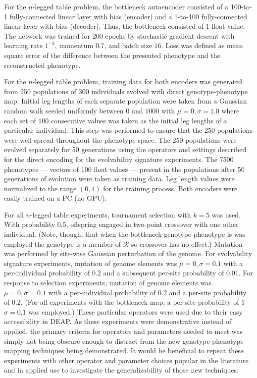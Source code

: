 For the $n$-legged table problem, the bottleneck autoencoder consisted of a 100-to-1 fully-connected linear layer with bias (encoder) and a 1-to-100 fully-connected linear layer with bias (decoder).
Thus, the bottleneck consisted of 1 float value.
The network was trained for 200 epochs by stochastic gradient descent with learning rate $1^{-3}$, momentum $0.7$, and batch size $16$.
Loss was defined as mean square error of the difference between the presented phenotype and the reconstructed phenotype.

For the $n$-legged table problem, training data for both encoders was generated from 250 populations of 300 individuals evolved with direct genotype-phenotype map.
Initial leg lengths of each separate population were taken from a Gaussian random walk seeded uniformly between $0$ and $1000$ with $\mu = 0, \sigma = 1.0$ where each set of 100 consecutive values was taken as the initial leg lengths of a particular individual.
This step was performed to ensure that the 250 populations were well-spread throughout the phenotype space.
The 250 populations were evolved separately for 50 generations using the operators and settings described for the direct encoding for the evolvability signature experiments.
The 7500 phenotypes --- vectors of 100 float values --- present in the populations after 50 generations of evolution were taken as training data.
Leg length values were normalized to the range $(0,1)$ for the training process.
Both encoders were easily trained on a PC (no GPU).

For all $n$-legged table experiments, tournament selection with $k = 5$ was used.
With probability $0.5$, offspring engaged in two-point crossover with one other individual.
(Note, though, that when the bottleneck genotype-phenotype is was employed the genotype is a member of $\mathcal{R}$ so crossover has no effect.)
Mutation was performed by site-wise Gaussian perturbation of the genome.
For evolvability signature experiments, mutation of genome elements was $\mu=0, \sigma=0.1$ with a per-individual probability of $0.2$ and a subsequent per-site probability of $0.01$.
For response to selection experiments, mutation of genome elements was $\mu=0, \sigma=0.1$ with a per-individual probability of $0.2$ and a per-site probability of $0.2$.
(For all experiments with the bottleneck map, a per-site probability of $1$ $\sigma=0.1$ was employed.)
These particular operators were used due to their easy accessibility in DEAP.
As these experiments were demonstrative instead of applied, the primary criteria
for operators and parameters needed to meet was simply not being obscure enough to distract from the new genotype-phenotype mapping techniques being demonstrated.
It would be beneficial to repeat these experiments with other operator and parameter choices popular in the literature and in applied use to investigate the generalizability of those new techniques.

